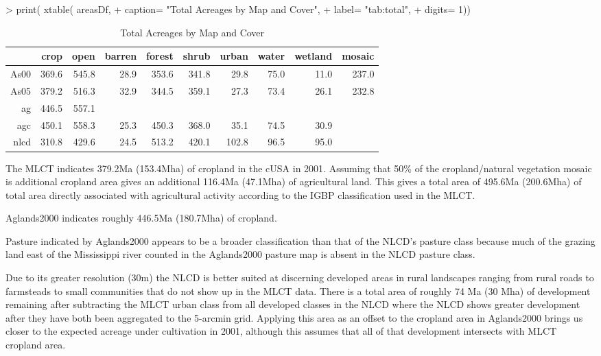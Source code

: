\begin{Schunk}
\begin{Sinput}
> print( xtable( areasDf, 
+               caption= "Total Acreages by Map and Cover", 
+               label= "tab:total",
+               digits= 1))
\end{Sinput}
\begin{table}[ht]
\begin{center}
\begin{tabular}{rrrrrrrrrr}
  \hline
 & crop & open & barren & forest & shrub & urban & water & wetland & mosaic \\ 
  \hline
As00 & 369.6 & 545.8 & 28.9 & 353.6 & 341.8 & 29.8 & 75.0 & 11.0 & 237.0 \\ 
  As05 & 379.2 & 516.3 & 32.9 & 344.5 & 359.1 & 27.3 & 73.4 & 26.1 & 232.8 \\ 
  ag & 446.5 & 557.1 &  &  &  &  &  &  &  \\ 
  agc & 450.1 & 558.3 & 25.3 & 450.3 & 368.0 & 35.1 & 74.5 & 30.9 &  \\ 
  nlcd & 310.8 & 429.6 & 24.5 & 513.2 & 420.1 & 102.8 & 96.5 & 95.0 &  \\ 
   \hline
\end{tabular}
\caption{Total Acreages by Map and Cover}
\label{tab:total}
\end{center}
\end{table}\end{Schunk}

The MLCT indicates 379.2Ma (153.4Mha) of
cropland in the cUSA in 2001. Assuming that 50\% of the
cropland/natural vegetation mosaic is additional cropland area gives
an additional 116.4Ma (47.1Mha)
of agricultural land. This gives a total area of 
495.6Ma (200.6Mha)
of total area directly associated with
agricultural activity according to the IGBP classification used in the
MLCT.

Aglands2000 indicates roughly 446.5Ma (180.7Mha) 
of cropland.

Pasture indicated by Aglands2000 appears to be a broader
classification than that of the NLCD's pasture class because much of
the grazing land east of the Mississippi river counted in the
Aglands2000 pasture map is absent in the NLCD pasture class.

Due to its greater resolution (30m) the NLCD is better suited at
discerning developed areas in rural landscapes ranging from rural
roads to farmsteads to small communities that do not show up in the
MLCT data. There is a total area of roughly 74 Ma (30 Mha) of
development remaining after subtracting the MLCT urban class from all
developed classes in the NLCD where the NLCD shows greater development
after they have both been aggregated to the 5-arcmin grid. Applying
this area as an offset to the cropland area in Aglands2000 brings us
closer to the expected acreage under cultivation in 2001, although
this assumes that all of that development intersects with MLCT
cropland area.

